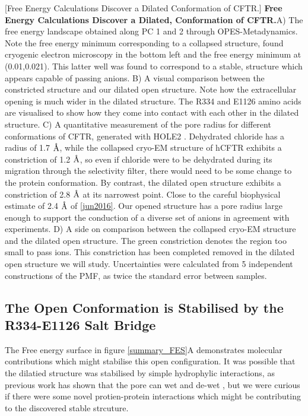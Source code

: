 	[Free Energy Calculations Discover a Dilated Conformation of CFTR.] {\textbf{Free Energy Calculations Discover a Dilated, Conformation of CFTR.}}{A) The free energy landscape obtained along PC 1 and 2 through OPES-Metadynamics. Note the free energy minimum corresponding to a collapsed structure, found cryogenic electron microscopy in the bottom left and the free energy minimum at (0.01,0.021). This latter well was found to correspond to a stable, structure which appears capable of passing anions. B) A visual comparison between the constricted structure and our dilated open structure. Note how the extracellular opening is much wider in the dilated structure. The R334 and E1126 amino acids are visualised to show how they come into contact with each other in the dilated structure. C) A quantitative measurement of the pore radius for different conformations of CFTR, generated with HOLE2 \cite{smart1996}. Dehydrated chloride has a radius of 1.7 $\textup{\AA}$, while the collapsed cryo-EM structure of hCFTR exhibits a constriction of 1.2 $\textup{\AA}$, so even if chloride were to be dehydrated during its migration through the selectivity filter, there would need to be some change to the protein conformation. By contrast, the dilated open structure exhibits a constriction of 2.8 $\textup{\AA}$ at its  narrowest point. Close to the careful biophysical estimate of 2.4 $\textup{\AA}$ of \ref{jun2016}. Our opened structure has a pore radius large enough to support the conduction of a diverse set of anions in agreement with experiments.  D) A side on comparison between the collapsed cryo-EM structure and the dilated open structure. The green constriction denotes the region too small to pass ions. This constriction has been completed removed in the dilated open structure we will study. Uncertainties were calculated from 5 independent constructions of the PMF, as twice the standard error between samples.}
	\label{summary_FES}
	\endgroup


\subsection{The Open Conformation is Stabilised by the R334-E1126 Salt Bridge}
\label{salt_bridge}
The Free energy surface in figure \ref{summary_FES}A demonstrates molecular contributions which might stabilise this open configuration. It was possible that the dilatied structure was stabilised by simple hydrophylic interactions, as previous work has shown that the pore can wet and de-wet \cite{}, but we were curious if there were some novel protien-protein interactions which might be contributing to the discovered stable strcuture. 

